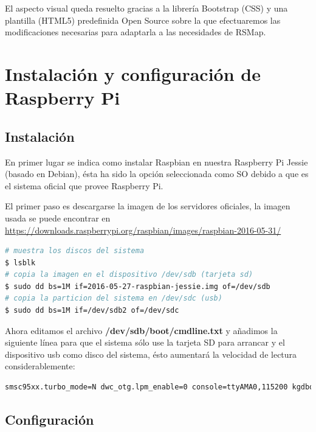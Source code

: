 El aspecto visual queda resuelto gracias a la librería Bootstrap (CSS) y una plantilla (HTML5) predefinida Open Source sobre la que efectuaremos las modificaciones necesarias para adaptarla a las necesidades de RSMap.

\section{Instalación y configuración de Raspberry Pi}

\subsection{Instalación}

En primer lugar se indica como instalar Raspbian en nuestra Raspberry Pi Jessie (basado en Debian), ésta ha sido la opción seleccionada como SO debido a que es el sistema oficial que provee Raspberry Pi.

\bigskip

El primer paso es descargarse la imagen de los servidores oficiales, la imagen usada se puede encontrar en \url{https://downloads.raspberrypi.org/raspbian/images/raspbian-2016-05-31/}

\begin{lstlisting}[language=bash,caption={Copia de Raspbian en tarjeta s y usb},label={lst:pi1}]
# muestra los discos del sistema
$ lsblk
# copia la imagen en el dispositivo /dev/sdb (tarjeta sd)
$ sudo dd bs=1M if=2016-05-27-raspbian-jessie.img of=/dev/sdb
# copia la particion del sistema en /dev/sdc (usb)
$ sudo dd bs=1M if=/dev/sdb2 of=/dev/sdc
\end{lstlisting}

\bigskip

Ahora editamos el archivo \textbf{/dev/sdb/boot/cmdline.txt} y añadimos la siguiente línea para que el sistema sólo use la tarjeta SD para arrancar y el dispositivo usb como disco del sistema, ésto aumentará la velocidad de lectura considerablemente:


\begin{lstlisting}[language=bash,caption={Modificando el dispositivo de arranque de Raspbian},label={lst:pi2}]
smsc95xx.turbo_mode=N dwc_otg.lpm_enable=0 console=ttyAMA0,115200 kgdboc=ttyAMA0,115200 console=tty1 root=/dev/sda1 rootfstype=ext4 elevator=noop rootwait # /dev/sda1 point to our USB drive
\end{lstlisting}

\bigskip

\subsection{Configuración}

